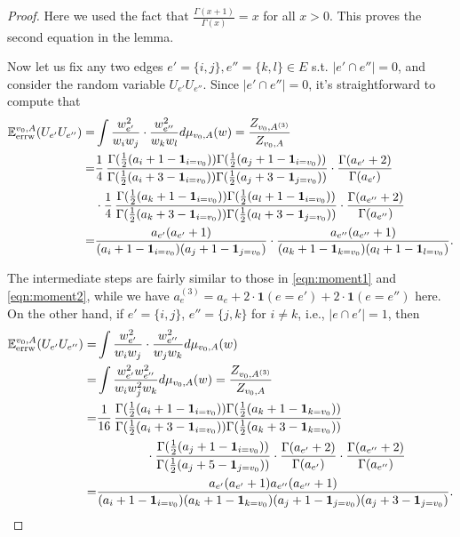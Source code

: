 \documentclass[a4paper, 11pt]{article}
\newcommand{\E}{\mathbb{E}}
\newcommand{\Eerrw}{\E_{\textnormal{errw}}}
\newcommand{\ind}{\mathbf{1}}
\begin{document}
\begin{proof}
Here we used the fact that $\frac{\Gamma(x+1)}{\Gamma(x)}=x$ for all $x>0$. This proves the second equation in the lemma.

Now let us fix any two edges $e'=\{i,j\}, e''=\{k,l\}\in E$ s.t. $|e'\cap e''|=0$, and consider the random variable $U_{e'} U_{e''}$. Since $|e'\cap e''|=0$, it's straightforward to compute that 
\begin{align}
\label{eqn:moment4}
\Eerrw^{v_0,A} (U_{e'} U_{e''})
=& \int \frac{w_{e'}^2}{w_iw_j}\cdot \frac{w_{e''}^2}{w_kw_l} d\mu_{v_0,A}(w) = \frac{Z_{v_0, A^{(3)}}}{Z_{v_0,A}}\nonumber \\
=& \frac{1}{4}\, \frac{\Gamma(\frac{1}{2}(a_i+1-\ind_{i=v_0}))\Gamma(\frac{1}{2}(a_j+1-\ind_{i=v_0}))}{\Gamma(\frac{1}{2}(a_i+3-\ind_{i=v_0}))\Gamma(\frac{1}{2}(a_j+3-\ind_{j=v_0}))}\cdot \frac{\Gamma(a_{e'}+2)}{\Gamma(a_{e'})}\nonumber \\
& \cdot \frac{1}{4}\, \frac{\Gamma(\frac{1}{2}(a_k+1-\ind_{i=v_0}))\Gamma(\frac{1}{2}(a_l+1-\ind_{i=v_0}))}{\Gamma(\frac{1}{2}(a_k+3-\ind_{i=v_0}))\Gamma(\frac{1}{2}(a_l+3-\ind_{j=v_0}))}\cdot \frac{\Gamma(a_{e''}+2)}{\Gamma(a_{e''})}\nonumber \\
=& \frac{a_{e'}(a_{e'}+1)}{(a_i+1-\ind_{i=v_0})(a_j+1-\ind_{j=v_0})}\cdot \frac{a_{e''}(a_{e''}+1)}{(a_k+1-\ind_{k=v_0})(a_l+1-\ind_{l=v_0})}.
\end{align}

The intermediate steps are fairly similar to those in \cref{eqn:moment1} and \cref{eqn:moment2}, while we have $a_e^{(3)}=a_e+2\cdot\ind(e=e')+2\cdot \ind(e=e'')$ here. On the other hand, if $e'=\{i,j\}$, $e''=\{j,k\}$ for $i\neq k$, i.e., $|e\cap e'|=1$, then 
\begin{align}
\label{eqn:moment5}
\Eerrw^{v_0,A} (U_{e'} U_{e''})
=& \int \frac{w_{e'}^2}{w_iw_j}\cdot \frac{w_{e''}^2}{w_jw_k} d\mu_{v_0,A}(w)\nonumber \\
=& \int \frac{w_{e'}^2w_{e''}^2}{w_iw_j^2w_k} d\mu_{v_0,A}(w) =\frac{Z_{v_0,A^{(3)}}}{Z_{v_0,A}}\nonumber \\
=& \frac{1}{16}\, \frac{\Gamma(\frac{1}{2}(a_i+1-\ind_{i=v_0}))\Gamma(\frac{1}{2}(a_k+1-\ind_{k=v_0}))}{\Gamma(\frac{1}{2}(a_i+3-\ind_{i=v_0}))\Gamma(\frac{1}{2}(a_k+3-\ind_{k=v_0}))}\nonumber \\
&\qquad\qquad \cdot \frac{\Gamma(\frac{1}{2}(a_j+1-\ind_{i=v_0}))}{\Gamma(\frac{1}{2}(a_j+5-\ind_{j=v_0}))}\cdot \frac{\Gamma(a_{e'}+2)}{\Gamma(a_{e'})}\cdot \frac{\Gamma(a_{e''}+2)}{\Gamma(a_{e''})}\nonumber \\
=& \frac{a_{e'}(a_{e'}+1)a_{e''}(a_{e''}+1)}{(a_i+1-\ind_{i=v_0})(a_k+1-\ind_{k=v_0})(a_j+1-\ind_{j=v_0})(a_j+3-\ind_{j=v_0})}.
\end{align}


\end{proof}
\end{document}
